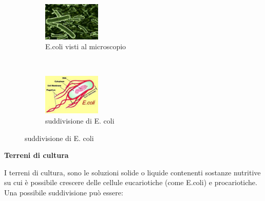 \begin{figure}[H]
  \centering

  \begin{subfigure}[b]{1\textwidth}
    \centering
    \includegraphics[width=0.3\textwidth]{./immagini/e_coli.jpeg}
    \caption{E.coli visti al microscopio}

  \end{subfigure}

  ~

  \begin{subfigure}[b]{1\textwidth}
    \centering
    \includegraphics[width=0.3\textwidth]{./immagini/e_coli1.jpeg}
    \caption{suddivisione di E. coli}

  \end{subfigure}

  \label{e_coli}

\end{figure}

\textbf{Terreni di cultura}
\vspace{0.3cm}

I terreni di cultura, sono le soluzioni solide o liquide contenenti sostanze
nutritive su cui è possibile crescere delle cellule eucariotiche (come E.coli) e procariotiche.
Una possibile suddivisione può essere:


